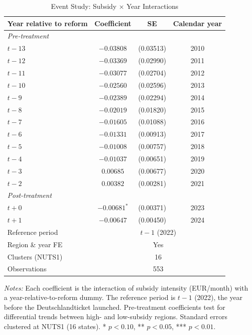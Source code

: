 \begin{table}[H]
\centering
\caption{Event Study: Subsidy $\times$ Year Interactions}
\label{tab:event}
\begin{threeparttable}
\begin{tabular}{lccc}
\toprule
Year relative to reform & Coefficient & SE & Calendar year \\
\midrule
\multicolumn{4}{l}{\textit{Pre-treatment}} \\
$t-13$ & $-0.03808$ & (0.03513) & 2010 \\
$t-12$ & $-0.03369$ & (0.02990) & 2011 \\
$t-11$ & $-0.03077$ & (0.02704) & 2012 \\
$t-10$ & $-0.02560$ & (0.02596) & 2013 \\
$t-9$ & $-0.02389$ & (0.02294) & 2014 \\
$t-8$ & $-0.02019$ & (0.01820) & 2015 \\
$t-7$ & $-0.01605$ & (0.01088) & 2016 \\
$t-6$ & $-0.01331$ & (0.00913) & 2017 \\
$t-5$ & $-0.01008$ & (0.00757) & 2018 \\
$t-4$ & $-0.01037$ & (0.00651) & 2019 \\
$t-3$ & $0.00685$ & (0.00677) & 2020 \\
$t-2$ & $0.00382$ & (0.00281) & 2021 \\
\midrule
\multicolumn{4}{l}{\textit{Post-treatment}} \\
$t+0$ & $-0.00681^{*}$ & (0.00371) & 2023 \\
$t+1$ & $-0.00647$ & (0.00450) & 2024 \\
\midrule
Reference period & \multicolumn{3}{c}{$t-1$ (2022)} \\
Region \& year FE & \multicolumn{3}{c}{Yes} \\
Clusters (NUTS1) & \multicolumn{3}{c}{16} \\
Observations & \multicolumn{3}{c}{553} \\
\bottomrule
\end{tabular}
\begin{tablenotes}[flushleft]
\small
\item \textit{Notes:} Each coefficient is the interaction of subsidy intensity (EUR/month) with a year-relative-to-reform dummy. The reference period is $t-1$ (2022), the year before the Deutschlandticket launched. Pre-treatment coefficients test for differential trends between high- and low-subsidy regions. Standard errors clustered at NUTS1 (16 states). * $p<0.10$, ** $p<0.05$, *** $p<0.01$.
\end{tablenotes}
\end{threeparttable}
\end{table}
